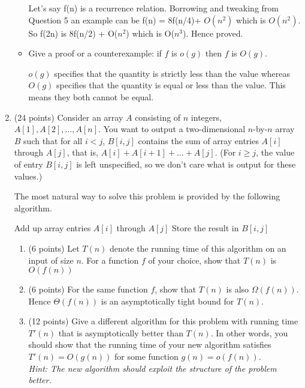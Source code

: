 \documentclass[11pt]{article}
\begin{document}
\begin{enumerate}
\begin{itemize}
Let's say f(n) is a recurrence relation. Borrowing and tweaking from Question 5 an example can be f(n) = 8f(n/4)+ $O(n^2)$ which is $O(n^2)$. So f(2n) is 8f(n/2) + O($n^2$) which is O($n^3$). Hence proved.
\item Give a proof or a counterexample: if $f$ is $o(g)$ then $f$ is $O(g)$.

$o(g)$ specifies that the quantity is strictly less than the value whereas $O(g)$ specifies that the quantity is equal or less than the value. This means they both cannot be equal. 

\end{itemize}

\bigskip

\item (24 points) Consider an array $A$ consisting of $n$ integers, $A[1], A[2], \ldots, A[n]$.
You want to output a two-dimensional $n$-by-$n$ array $B$ such that for all
$i<j$, $B[i, j]$ contains the sum of array entries $A[i]$ through $A[j]$, that is,
$A[i]+ A[i+1] + \ldots + A[j]$. (For $i \geq j$, the value of entry $B[i,j]$
is left unspecified, so we don't care what is output for these values.)

The most natural way to solve this problem is provided by the following algorithm. 
\begin{algorithmic}
\State {}
\State Add up array entries $A[i]$ through $A[j]$
\State Store the result in $B[i,j]$
\EndFor
\EndFor
\end{algorithmic}

\begin{enumerate}
\item (6 points) Let $T(n)$ denote the running time of this algorithm  on an input of size $n$. 
For a function $f$ of your choice, show that $T(n)$ is  $O(f(n))$

\item (6 points) For the same function $f$, show that $T(n)$ is also $\Omega( f(n) )$.  
Hence  $\Theta(f(n))$ is an  asymptotically tight bound for $T(n)$.

\item (12 points) Give a different algorithm for this problem with running time $T'(n)$ 
that is asymptotically better than $T(n)$. In other words, you should show 
that the running time of your new algorithm satisfies $T'(n)= O(g(n))$ for
some function $g(n) = o( f(n) )$.  \\
{\em Hint: The new algorithm should exploit 
the structure of the problem better.}
\end{enumerate}






\end{enumerate}
\end{document}
